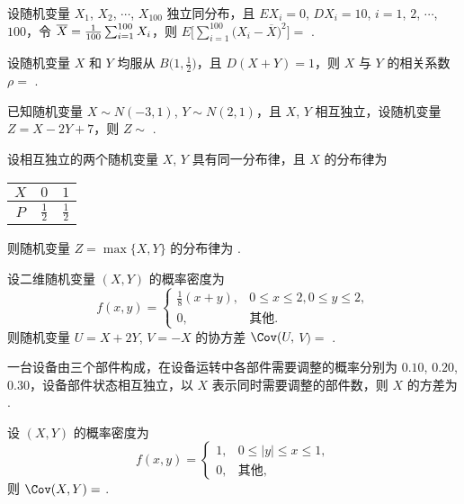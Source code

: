 	\begin{titwo}
		设随机变量 $X_{1}$, $X_{2}$, $\cdots$, $X_{100}$ 独立同分布，且 $EX_{i} = 0$, $DX_{i} = 10$, $i = 1$, $2$, $\cdots$, $100$，令 $\overline{X} = \frac{1}{100} \* \sum_{i=1}^{100} X_{i}$，则 $E\Biggl[ \sum_{i=1}^{100} \bigl( X_{i} - \overline{X} \bigr)^{2} \Biggr] = $ \htwo.
	\end{titwo}

	\begin{titwo}
		设随机变量 $X$ 和 $Y$ 均服从 $B\bigl( 1,\frac{1}{2} \bigr)$，且 $D(X + Y) = 1$，则 $X$ 与 $Y$ 的相关系数 $\rho = $ \htwo.
	\end{titwo}

	\begin{titwo}
		已知随机变量 $X \sim N(-3,1)$, $Y \sim N(2,1)$，且 $X$, $Y$ 相互独立，设随机变量 $Z = X - 2Y + 7$，则 $Z \sim $ \htwo.
	\end{titwo}

	\begin{titwo}
		设相互独立的两个随机变量 $X$, $Y$ 具有同一分布律，且 $X$ 的分布律为
		\begin{center}
			\begin{tabular}{c|cc}
				\hline
				$X$ & $0$ & $1$ \\
				\hline
				$P$ & $\frac{1}{2}$ & $\frac{1}{2}$ \\
				\hline
			\end{tabular}
		\end{center}
		则随机变量 $Z = \max\{X,Y\}$ 的分布律为 \htwo.
	\end{titwo}

	\begin{titwo}
		设二维随机变量 $(X,Y)$ 的概率密度为
		\[
			f(x,y) = \begin{cases}
				\frac{1}{8} (x + y), & 0 \leq x \leq 2,0 \leq y \leq 2, \\
				0, & \text{其他}.
			\end{cases}
		\]
		则随机变量 $U = X + 2Y$, $V = -X$ 的协方差 $\Cov(U,$ $V) = $ \htwo.
	\end{titwo}

	\begin{titwo}
		一台设备由三个部件构成，在设备运转中各部件需要调整的概率分别为 $0.10$, $0.20$, $0.30$，设备部件状态相互独立，以 $X$ 表示同时需要调整的部件数，则 $X$ 的方差为 \htwo.
	\end{titwo}

	\begin{titwo}
		设 $(X,Y)$ 的概率密度为
		\[
		f(x,y) = \begin{cases}
			1, & 0 \leq |y| \leq x \leq 1, \\
			0, & \text{其他},
		\end{cases}
		\]
		则 $\Cov(X,Y) = $ \htwo.
	\end{titwo}

